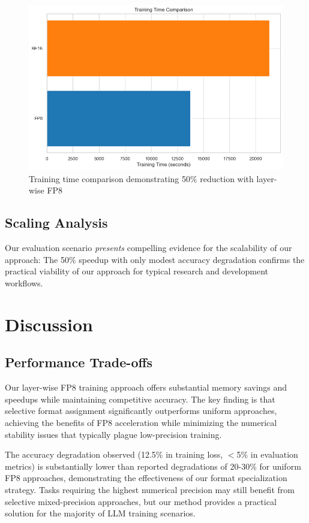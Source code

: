 \documentclass[conference]{IEEEtran}
\begin{document}
\begin{figure}[htbp]
    \centering
    \includegraphics[width=1\linewidth]{training_time.png}
    \caption{Training time comparison demonstrating 50\% reduction with layer-wise FP8}
    \label{fig:training_time}
\end{figure}

\subsection{Scaling Analysis}

Our evaluation scenario \emph{presents} compelling evidence for the scalability of our approach: The 50\% speedup with only modest accuracy degradation confirms the practical viability of our approach for typical research and development workflows.

\section{Discussion}

\subsection{Performance Trade-offs}

Our layer-wise FP8 training approach offers substantial memory savings and speedups while maintaining competitive accuracy. The key finding is that selective format assignment significantly outperforms uniform approaches, achieving the benefits of FP8 acceleration while minimizing the numerical stability issues that typically plague low-precision training.

The accuracy degradation observed (12.5\% in training loss, $<$5\% in evaluation metrics) is substantially lower than reported degradations of 20-30\% for uniform FP8 approaches, demonstrating the effectiveness of our format specialization strategy. Tasks requiring the highest numerical precision may still benefit from selective mixed-precision approaches, but our method provides a practical solution for the majority of LLM training scenarios.
\end{document}
